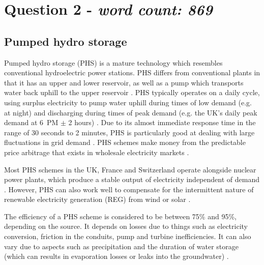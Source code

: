 \section{Question 2 - \textit{word count: 869}}



\subsection{Pumped hydro storage}

Pumped hydro storage (PHS) is a mature technology which resembles conventional hydroelectric power stations.
PHS differs from conventional plants in that it has an upper and lower reservoir, as well as a pump which transports water back uphill to the upper reservoir \citep{Kocher-Oberlehner2014, ScotsRenewables2011}.
PHS typically operates on a daily cycle, using surplus electricity to pump water uphill during times of low demand (e.g. at night) and discharging during times of peak demand (e.g. the UK's daily peak demand at 6~PM $\pm$ 2 hours) \citep{Mearns2018, Kocher-Oberlehner2014, ScotsRenewables2011}.
Due to its almost immediate response time in the range of 30 seconds to 2 minutes, PHS is particularly good at dealing with large fluctuations in grid demand \citep{ScotsRenewables2011, ESMStudy2010}.
PHS schemes make money from the predictable price arbitrage that exists in wholesale electricity markets \citep{Mearns2018, Strathclyde2004}.

Most PHS schemes in the UK, France and Switzerland operate alongside nuclear power plants, which produce a stable output of electricity independent of demand \citep{Mearns2018, Kocher-Oberlehner2014}.
However, PHS can also work well to compensate for the intermittent nature of renewable electricity generation (REG) from wind or solar \citep{Kocher-Oberlehner2014}.

The efficiency of a PHS scheme is considered to be between 75\% and 95\%, depending on the source.
It depends on losses due to things such as electricity conversion, friction in the conduits, pump and turbine inefficiencies.
It can also vary due to aspects such as precipitation and the duration of water storage (which can results in evaporation losses or leaks into the groundwater) \citep{WillsComment2015, Kocher-Oberlehner2014}.

